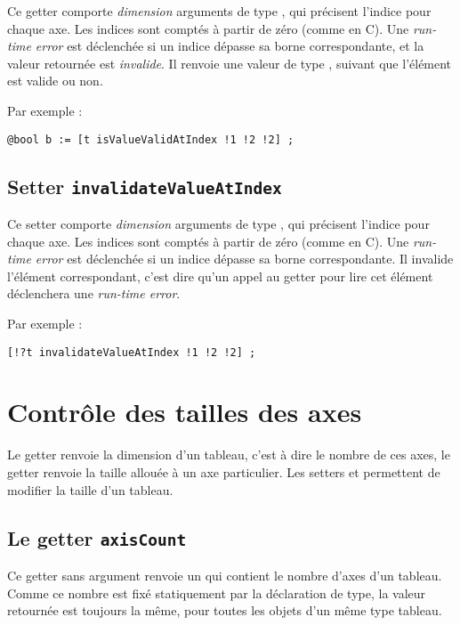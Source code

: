 Ce getter comporte \emph{dimension} arguments de type , qui précisent l'indice pour chaque axe. Les indices sont comptés à partir de zéro (comme en C). Une \emph{run-time error} est déclenchée si un indice dépasse sa borne correspondante, et la valeur retournée est \emph{invalide}. Il renvoie une valeur de type , suivant que l'élément est valide ou non.

Par exemple :
\begin{lstlisting}[language=galgas]
  @bool b := [t isValueValidAtIndex !1 !2 !2] ;
\end{lstlisting}


\subsection{Setter \texttt{invalidateValueAtIndex}}

Ce setter comporte \emph{dimension} arguments de type , qui précisent l'indice pour chaque axe. Les indices sont comptés à partir de zéro (comme en C). Une \emph{run-time error} est déclenchée si un indice dépasse sa borne correspondante. Il invalide l'élément correspondant, c'est dire qu'un appel au getter  pour lire cet élément déclenchera une \emph{run-time error}.

Par exemple :
\begin{lstlisting}[language=galgas]
  [!?t invalidateValueAtIndex !1 !2 !2] ;
\end{lstlisting}





\section{Contrôle des tailles des axes}

Le getter  renvoie la dimension d'un tableau, c'est à dire le nombre de ces axes, le getter  renvoie la taille allouée à un axe particulier. Les setters  et  permettent de modifier la taille d'un tableau.



\subsection{Le getter \texttt{axisCount}}

Ce getter sans argument renvoie un  qui contient le nombre d'axes d'un tableau. Comme ce nombre est fixé statiquement par la déclaration de type, la valeur retournée est toujours la même, pour toutes les objets d'un même type tableau.


